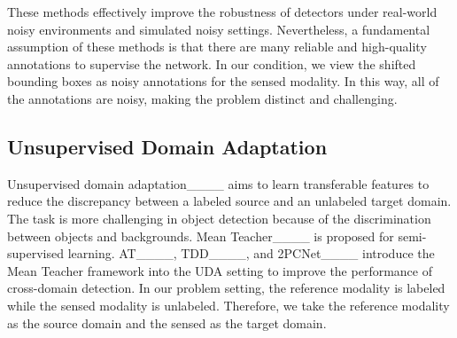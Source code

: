 These methods effectively improve the robustness of detectors under real-world noisy environments and simulated noisy settings. Nevertheless, a fundamental assumption of these methods is that there are many reliable and high-quality annotations to supervise the network. In our condition, we view the shifted bounding boxes as noisy annotations for the sensed modality. In this way, all of the annotations are noisy, making the problem distinct and challenging. 

\subsection{Unsupervised Domain Adaptation}
Unsupervised domain adaptation____ aims to learn transferable features to reduce the discrepancy between a labeled source and an unlabeled target domain. The task is more challenging in object detection because of the discrimination between objects and backgrounds. Mean Teacher____ is proposed for semi-supervised learning. AT____, TDD____, and 2PCNet____ introduce the Mean Teacher framework into the UDA setting to improve the performance of cross-domain detection. In our problem setting, the reference modality is labeled while the sensed modality is unlabeled. Therefore, we take the reference modality as the source domain and the sensed as the target domain.
